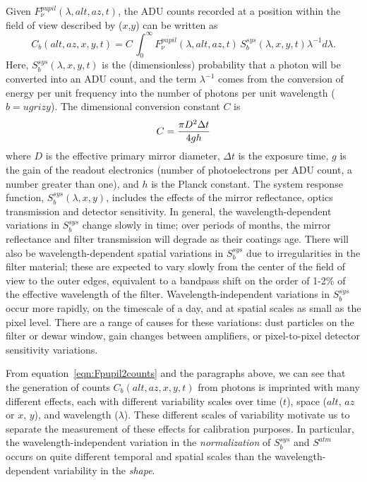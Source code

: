 \documentclass[12pt,preprint]{aastex}
\begin{document}
Given $F_\nu^{pupil}(\lambda,alt,az,t)$, the ADU counts recorded at a
position within the field of view described by ($x$,$y$) can be
written as
\begin{equation}
\label{eqn:Fpupil2counts}
    C_b(alt,az,x,y,t) = C \, \int_0^\infty {F_\nu^{pupil}(\lambda,alt,az,t) \, S_b^{sys}(\lambda,x,y,t) \lambda^{-1}d\lambda}.
\end{equation}
Here, $S_b^{sys}(\lambda,x,y,t)$ is the (dimensionless) probability
that a photon will be converted into an ADU count, and the term
$\lambda^{-1}$ comes from the conversion of energy per unit frequency
into the number of photons per unit wavelength ($b=ugrizy$). The
dimensional conversion constant $C$ is
\begin{equation}
\label{eqn:Cconstant}
        C = {\pi D^2 \Delta t \over 4 g h }  
\end{equation}
where $D$ is the effective primary mirror diameter, $\Delta t$ is the
exposure time, $g$ is the gain of the readout electronics (number of
photoelectrons per ADU count, a number greater than one), and $h$ is
the Planck constant. The system response function,
$S_b^{sys}(\lambda,x,y)$, includes the effects of the mirror
reflectance, optics transmission and detector sensitivity. In general,
the wavelength-dependent variations in $S_b^{sys}$ change slowly in time; over
periods of months, the mirror reflectance and filter transmission will
degrade as their coatings age. There will also be wavelength-dependent
spatial variations in $S_b^{sys}$ due to irregularities in the filter
material; these are expected to vary slowly from the center of the
field of view to the outer edges, equivalent to a bandpass shift on
the order of 1-2\% of the effective wavelength of the
filter. Wavelength-independent variations in $S_b^{sys}$ occur more
rapidly, on the timescale of a day, and at spatial scales as
small as the pixel level. There are a range of causes for these
variations: dust particles on the filter or dewar window, gain changes
between amplifiers, or pixel-to-pixel detector sensitivity variations. 

From equation~\ref{eqn:Fpupil2counts} and the paragraphs above, we can
see that the generation of counts $C_b(alt,az,x,y,t)$ from photons is
imprinted with many different effects, each with different variability
scales over time ($t$), space ($alt$, $az$ or $x$, $y$), and
wavelength ($\lambda$). These different scales of variability motivate
us to separate the measurement of these effects for calibration
purposes. In particular, the 
wavelength-independent variation in the {\it normalization} of $S_b^{sys}$ and $S^{atm}$
occurs on quite different temporal and spatial scales than the
wavelength-dependent variability in the {\it
shape}.
\end{document}
